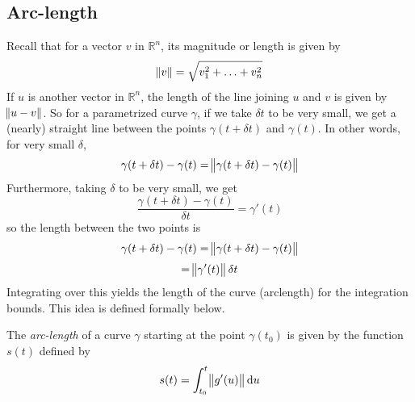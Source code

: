 \subsection{Arc-length}
Recall that for a vector \(v\) in \(\mathbb{R}^{n}\), its magnitude or length is given by
\[
    \norm{v} = \sqrt{v_{1}^{2} + \ldots + v_{n}^{2}}
\]
If \(u\) is another vector in \(\mathbb{R}^{n}\), the length of the line joining \(u\) and
\(v\) is given by \(\norm{u-v}\). So for a parametrized curve \(\gamma\), if we take \( \delta t\) to be very small, we get a (nearly) straight line between the points \(\gamma
(t + \delta t)\) and \(\gamma(t)\). In other words, for very small \(\delta\),
\[
    \gamma(t + \delta t) - \gamma(t) = \norm{\gamma(t + \delta t) - \gamma(t)}
\]
Furthermore, taking \(\delta\) to be very small, we get
\[
    \frac{\gamma(t + \delta t) - \gamma(t)}{\delta t} = \gamma'(t)
\]
so the length between the two points is
\[
    \gamma(t + \delta t) - \gamma(t) = \norm{\gamma(t + \delta t) - \gamma(t)}
\]
\[
    = \norm{\gamma'(t)}\delta t
\]
Integrating over this yields the length of the curve (arclength) for the integration bounds. This idea is defined formally below.

\begin{definition}
    The \textit{arc-length} of a curve \(\gamma\) starting at the point \(\gamma(t_{0}) \) is given by the function \(s(t) \) defined by
    \[
        s(t) = \int_{t_{0}}^{t} \norm{g'(u)} \dif u
    \]
\end{definition}

